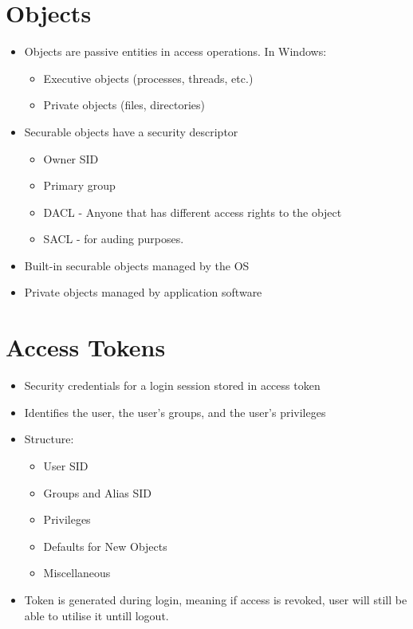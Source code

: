 \documentclass{article}
\begin{document}
\section{Objects}
\begin{itemize}
  \item Objects are passive entities in access operations. In Windows: 
  \begin{itemize}
    \item Executive objects (processes, threads, etc.) 
    \item Private objects (files, directories) 
  \end{itemize}
  \item Securable objects have a security descriptor 
  \begin{itemize}
    \item Owner SID
    \item Primary group
    \item DACL - Anyone that has different access rights to the object
    \item SACL - for auding purposes.
  \end{itemize}
  \item Built-in securable objects managed by the OS 
  \item Private objects managed by application software
\end{itemize}

\section{Access Tokens}
\begin{itemize}
  \item Security credentials for a login session stored in access token 
  \item Identifies the user, the user’s groups, and the user’s privileges
  \item Structure:
  \begin{itemize}
    \item User SID
    \item Groups and Alias SID
    \item Privileges
    \item Defaults for New Objects
    \item Miscellaneous
  \end{itemize}
  \item Token is generated during login, meaning if access is revoked, user will still be able to utilise it untill logout.
\end{itemize}
\end{document}

